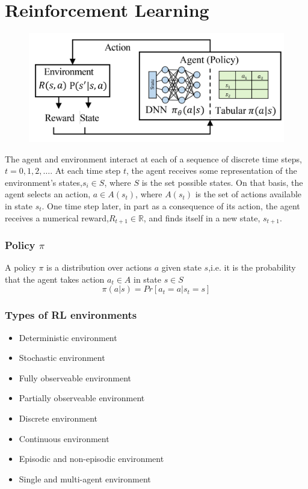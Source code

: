 \section{Reinforcement Learning}
\begin{figure}[!h]
    \includegraphics[width = \columnwidth]{figures/13/AgentEnvironment.png}    
\end{figure}
The agent and environment interact at each of a sequence of discrete time steps,\(t = 0,1,2,\dots\).
At each time step \(t\), the agent receives some representation of the environment's states,\(s_i \in S\), where \(S\) is the set possible states.
On that basis, the agent selects an action, \(a\in A(s_t)\), where \(A(s_t)\) is the set of actions available in state \(s_t\).
One time step later, in part as a consequence of its action, the agent receives a numerical reward,\(R_{t+1}\in \mathbb{R}\), and finds itself in a new state, \(s_{t+1}\).
\subsubsection{Policy \(\pi\)}
A policy \(\pi\) is a distribution over actions \(a\) given state \(s\),i.e. it is the probability that the agent takes action \(a_t \in A\) in state \(s \in S\)
\[
\pi(a|s) = Pr\left[a_t = a|s_t = s\right]
\]
\subsubsection{Types of RL environments}
\begin{itemize}
    \item Deterministic environment
    \item Stochastic environment
    \item Fully observeable environment
    \item Partially observeable environment
    \item Discrete environment
    \item Continuous environment
    \item Episodic and non-episodic environment
    \item Single and multi-agent environment
\end{itemize}
